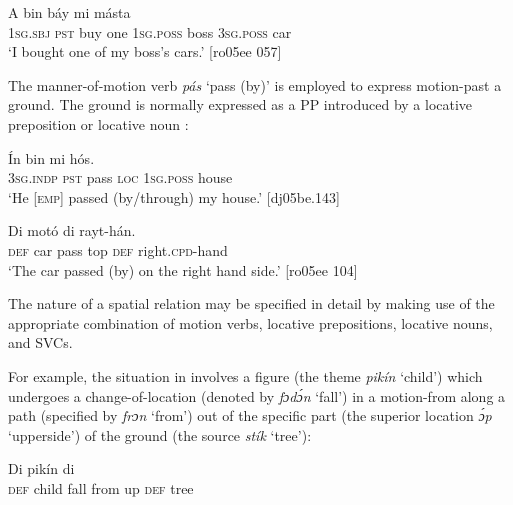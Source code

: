 \ea%
    \label{ex:key:985}
    \gll A    bin  báy   mi    másta  \\
\textsc{1sg.sbj}  \textsc{pst}  buy  one    \textsc{1sg.poss}  boss    \textsc{3sg.poss}  car\\

\glt ‘I bought one of my boss’s cars.’ [ro05ee 057]
\z

The manner-of-motion verb \textit{pás} ‘pass (by)’ is employed to express motion-past a ground. The ground is normally expressed as a PP introduced by a locative preposition  or locative noun\index{} : 


\ea%
    \label{ex:key:986}
    \gll \'{I}n    bin     mi    hós.\\
\textsc{3sg.indp}  \textsc{pst}  pass  \textsc{loc}  \textsc{1sg.poss}  house\\
\glt ‘He [\textsc{emp}] passed (by/through) my house.’ [dj05be.143]
\z

\ea%
    \label{ex:key:987}
    \gll Di  motó      di  rayt-hán.\\
\textsc{def}  car    pass  top    \textsc{def}  right.\textsc{cpd}{}-hand\\

\glt ‘The car passed (by) on the right hand side.’ [ro05ee 104]
\z

The nature of a spatial relation may be specified in detail by making use of the appropriate combination of motion verbs, locative prepositions, locative nouns, and SVCs.


For example, the situation in  involves a figure (the theme \textit{pikín} ‘child’) which undergoes a change-of-location (denoted by \textit{fɔdɔ́n} ‘fall’) in a motion-from along a path (specified by \textit{frɔn} ‘from’) out of the specific part (the superior location \textit{ɔ́p} ‘upperside’) of the ground (the source \textit{stík} ‘tree’):



\ea%
    \label{ex:key:988}
    \gll Di  pikín          di  \\
\textsc{def}  child  fall    from  up  \textsc{def}  tree\\


